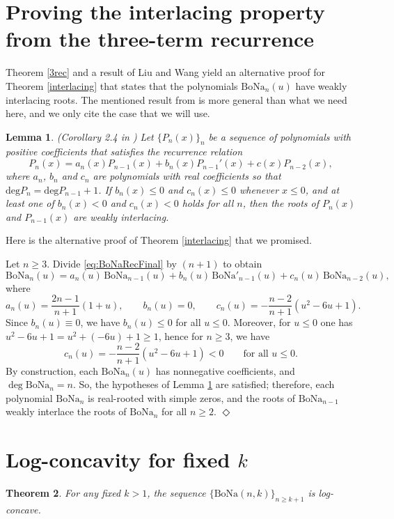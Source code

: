\documentclass[11pt]{article}
\newcommand{\bona}{\mathrm{BoNa}}
\newcommand{\qed}{\mbox{$\Diamond$}\vspace{\baselineskip}}
\newtheorem{theorem}{Theorem}[section]
\newtheorem{lemma}[theorem]{Lemma}
\newenvironment{proof}{\noindent {\bf Proof:}}{{\qed}}
\begin{document}
\section{Proving the interlacing property from the three-term recurrence} \label{Sturm}
Theorem \ref{3rec} and a result of Liu and Wang \cite{liuwang} yield an alternative proof for Theorem \ref{interlacing} that states that 
the polynomials $\bona_n(u)$ have weakly interlacing roots. The  mentioned result from \cite{liuwang} is more general than what we need here,
and we only cite the case that we will use. 

\begin{lemma} (Corollary 2.4 in \cite{liuwang}) \label{liw}  Let $\{P_n(x)\}_n$ be  a sequence of polynomials with positive coefficients
  that satisfies the recurrence relation
\begin{equation} \label{liuwangrec} P_n(x)=a_n(x)P_{n-1}(x)+b_n(x)P_{n-1}'(x)+c(x)P_{n-2}(x), \end{equation}
where $a_n$, $b_n$ and $c_n$ are polynomials with real coefficients so that 
$\mathrm{deg} P_n = \mathrm{deg} P_{n-1}+1$. If $b_n(x)\leq 0$ and $c_n(x)\leq 0$ whenever $x\leq 0$, 
and at least one of $b_n(x)<0$ and $c_n(x)<0$ holds for all $n$, then the roots of $P_n(x)$ and $P_{n-1}(x)$
are weakly interlacing.
\end{lemma}

Here is the alternative proof of Theorem \ref{interlacing} that we promised. 

\begin{proof} Let $n\geq 3$. 
Divide \eqref{eq:BoNaRecFinal} by $(n+1)$ to obtain
\[
\bona_n(u)=a_n(u)\,\bona_{n-1}(u)+b_n(u)\,\bona'_{n-1}(u)+c_n(u)\,\bona_{n-2}(u),
\]
where
\[
a_n(u)=\frac{2n-1}{n+1}(1+u),\qquad b_n(u)=0,\qquad
c_n(u)=-\frac{n-2}{n+1}(u^2-6u+1).
\]
Since $b_n(u)\equiv 0$, we have $b_n(u)\le 0$ for all $u\le 0$.
Moreover, for $u\le 0$ one has $u^2-6u+1=u^2+(-6u)+1\ge 1$, hence for $n\ge 3$, we have
\[
c_n(u)=-\frac{n-2}{n+1}(u^2-6u+1)<0\qquad\text{for all }u\le 0.
\]
By construction, each $\bona_n(u)$ has nonnegative coefficients, and $\deg \bona_n=n$.
So,  the hypotheses of Lemma \ref{liw} are satisfied; therefore,  each polynomial $\bona_n$ is real-rooted with simple zeros, and the  roots of $\bona_{n-1}$
weakly interlace the roots of $\bona_n$ for all $n\ge 2$.
\end{proof}

\section{Log-concavity for fixed $k$}  \label{logc-vert}
\begin{theorem} For any fixed $k>1$, the sequence $\{\bona(n,k)\}_{n\geq k+1}$ is log-concave.
\end{theorem}
\end{document}
